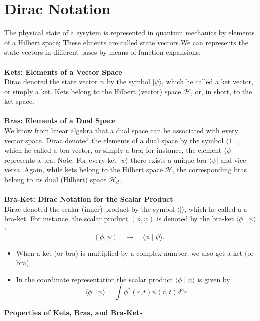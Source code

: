 \section{Dirac Notation}
The physical state of a sysytem is represented in quantum mechanics by elements of a Hilbert space; These elments are called state vectors.We can represents the state vectors in different bases by means of function expansions.\\\\
\textbf{Kets: Elements of a Vector Space}\\
Dirac denoted the state vector $\psi $ by the symbol $|\psi\rangle$, which he called a ket vector, or simply a ket. Kets belong to the Hilbert (vector) space $\mathcal{H}$, or, in short, to the ket-space.\\\\
\textbf{Bras: Elements of a Dual Space}\\
We know from linear algebra that a dual space can be associated with every vector space. Dirac denoted the elements of a dual space by the symbol $\langle 1 \mid$, which he called a bra vector, or simply a bra; for instance, the element $\langle\psi \mid$ represents a bra. Note: For every ket $|\psi\rangle$ there exists a unique bra $\langle\psi|$ and vice versa. Again, while kets belong to the Hilbert space $\mathcal{H}$, the corresponding bras belong to its dual (Hilbert) space $\mathcal{H}_{d}$.\\\\
 \textbf{Bra-Ket: Dirac Notation for the Scalar Product}\\
 Dirac denoted the scalar (inner) product by the symbol $\langle\mid\rangle$, which he called a a bra-ket. For instance, the scalar product $(\phi, \psi)$ is denoted by the bra-ket $\langle\phi \mid \psi\rangle$ :
 $$
 (\phi, \psi) \quad \longrightarrow \quad\langle\phi \mid \psi\rangle \text {. }
 $$
 \begin{note}
 	\begin{itemize}
 		\item When a ket (or bra) is multiplied by a complex number, we also get a ket (or bra).
 		\item In the coordinate representation,the scalar product $\langle\phi \mid \psi\rangle$ is given by\\
 		$$\langle\phi \mid \psi\rangle=\int \phi^*(r,t)\psi(r,t)d^3r$$
 	\end{itemize}
 \end{note}
\newpage
\textbf{ Properties of Kets, Bras, and Bra-Kets}  \\
